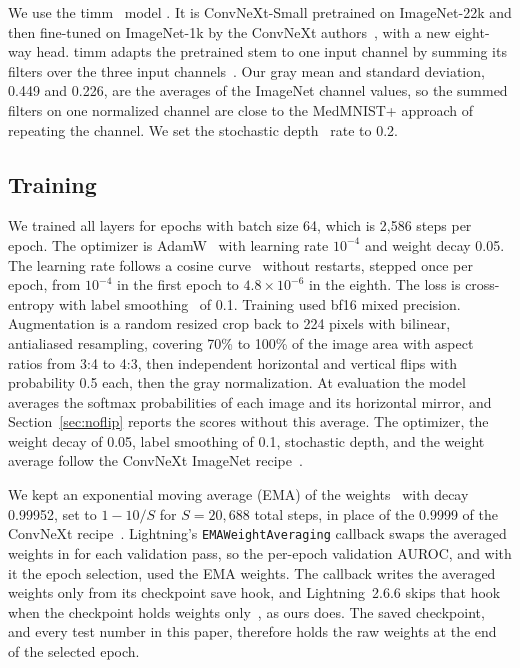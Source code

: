 \documentclass[conference]{IEEEtran}
\newif\ifanycitation
\let\citeAnyKey\cite
\renewcommand{\cite}{\global\anycitationtrue\citeAnyKey}
\begin{document}
We use the timm~\cite{wightman2019timm} model
. It is ConvNeXt-Small pretrained on
ImageNet-22k and then fine-tuned on ImageNet-1k by the ConvNeXt
authors~\cite{liu2022convnext}, with a new eight-way head. timm adapts the pretrained stem
to one input channel by summing its filters over the three input
channels~\cite{timm1031adapt}. Our gray mean and standard deviation, 0.449 and 0.226, are
the averages of the ImageNet channel values, so the summed filters on one normalized
channel are close to the MedMNIST+ approach of repeating the channel. We set the
stochastic depth~\cite{huang2016stochastic} rate to 0.2.

\subsection{Training}

We trained all layers for \epochs{} epochs with batch size 64, which is 2,586 steps per
epoch. The optimizer is AdamW~\cite{loshchilov2019adamw} with learning rate $10^{-4}$ and
weight decay 0.05. The learning rate follows a cosine curve~\cite{loshchilov2017sgdr}
without restarts, stepped once per epoch, from $10^{-4}$ in the first epoch to
$4.8\times10^{-6}$ in the eighth. The loss is cross-entropy with label
smoothing~\cite{szegedy2016inception} of 0.1. Training used bf16 mixed precision.
Augmentation is a random resized crop back to 224 pixels with bilinear, antialiased
resampling, covering 70\% to 100\% of the image area with aspect ratios from 3:4 to 4:3,
then independent horizontal and vertical flips with probability 0.5 each, then the gray
normalization. At evaluation the model averages the softmax probabilities of each image
and its horizontal mirror, and Section~\ref{sec:noflip} reports the scores without this
average. The optimizer, the weight decay of 0.05, label smoothing of
0.1, stochastic depth, and the weight average follow the ConvNeXt ImageNet
recipe~\cite{liu2022convnext}.

We kept an exponential moving average (EMA) of the weights~\cite{polyak1992averaging}
with decay 0.99952, set to $1-10/S$ for $S=20{,}688$ total steps, in place of the 0.9999
of the ConvNeXt recipe~\cite{liu2022convnext}. Lightning's \texttt{EMAWeightAveraging}
callback swaps the averaged weights in for each validation pass, so the per-epoch
validation AUROC, and with it the epoch selection, used the EMA weights. The callback
writes the averaged weights only from its checkpoint save hook, and Lightning~2.6.6 skips
that hook when the checkpoint holds weights only~\cite{lightning266checkpoint}, as ours
does. The saved checkpoint, and every test number in this paper, therefore holds the raw
weights at the end of the selected epoch.
\end{document}
